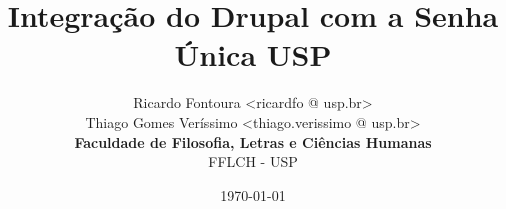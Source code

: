 \documentclass{beamer}
\begin{document}
  \title{Integração do Drupal com a Senha Única USP}
  \author{Ricardo Fontoura <ricardfo @ usp.br> \\ Thiago Gomes Veríssimo <thiago.verissimo @ usp.br> \\  
   \textbf{Faculdade de Filosofia, Letras e Ciências Humanas}\\
   FFLCH - USP}
  \date{\today}


\end{document}
